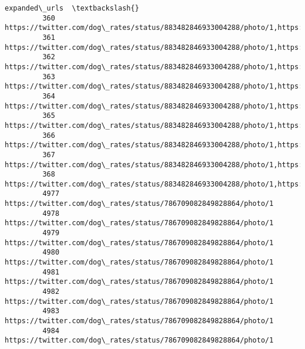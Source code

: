 \documentclass[11pt]{article}
\begin{document}
\begin{Verbatim}[commandchars=\\\{\}]
                                                                                                                                 expanded\_urls  \textbackslash{}
         360   https://twitter.com/dog\_rates/status/883482846933004288/photo/1,https://twitter.com/dog\_rates/status/883482846933004288/photo/1   
         361   https://twitter.com/dog\_rates/status/883482846933004288/photo/1,https://twitter.com/dog\_rates/status/883482846933004288/photo/1   
         362   https://twitter.com/dog\_rates/status/883482846933004288/photo/1,https://twitter.com/dog\_rates/status/883482846933004288/photo/1   
         363   https://twitter.com/dog\_rates/status/883482846933004288/photo/1,https://twitter.com/dog\_rates/status/883482846933004288/photo/1   
         364   https://twitter.com/dog\_rates/status/883482846933004288/photo/1,https://twitter.com/dog\_rates/status/883482846933004288/photo/1   
         365   https://twitter.com/dog\_rates/status/883482846933004288/photo/1,https://twitter.com/dog\_rates/status/883482846933004288/photo/1   
         366   https://twitter.com/dog\_rates/status/883482846933004288/photo/1,https://twitter.com/dog\_rates/status/883482846933004288/photo/1   
         367   https://twitter.com/dog\_rates/status/883482846933004288/photo/1,https://twitter.com/dog\_rates/status/883482846933004288/photo/1   
         368   https://twitter.com/dog\_rates/status/883482846933004288/photo/1,https://twitter.com/dog\_rates/status/883482846933004288/photo/1   
         4977  https://twitter.com/dog\_rates/status/786709082849828864/photo/1                                                                   
         4978  https://twitter.com/dog\_rates/status/786709082849828864/photo/1                                                                   
         4979  https://twitter.com/dog\_rates/status/786709082849828864/photo/1                                                                   
         4980  https://twitter.com/dog\_rates/status/786709082849828864/photo/1                                                                   
         4981  https://twitter.com/dog\_rates/status/786709082849828864/photo/1                                                                   
         4982  https://twitter.com/dog\_rates/status/786709082849828864/photo/1                                                                   
         4983  https://twitter.com/dog\_rates/status/786709082849828864/photo/1                                                                   
         4984  https://twitter.com/dog\_rates/status/786709082849828864/photo/1                                                                   

\end{Verbatim}
\end{document}
